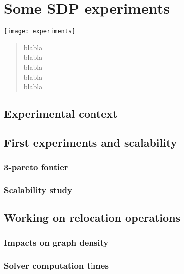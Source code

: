 \chapter{Some SDP experiments} \label{chap:sdpExp}
\begin{bibunit}[ieeetr]
\minitoc
\vspace{2cm}

\begin{minipage}[c]{0.45\linewidth}
\texttt{[image: experiments]}
\end{minipage}
\hfill
\begin{minipage}[c]{0.45\linewidth}
\begin{abstract}
blabla\\
blabla\\
blabla\\
blabla\\
blabla\\
\end{abstract}
\end{minipage}

\newpage
\section{Experimental context}

\newpage
\section{First experiments and scalability}
\subsection{3-pareto fontier}
\subsection{Scalability study}

\newpage
\section{Working on relocation operations}
\subsection{Impacts on graph density}
\subsection{Solver computation times}

\newpage
{}
\renewcommand{\bibname}{Bibliography of chapter \thechapter}
\end{bibunit}
